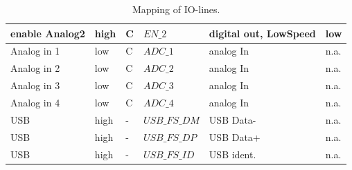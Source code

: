 \begin{table}[H]
\begin{tabular}{|l|l|l|l|l|l|}
					enable Analog2	& high 	& C		& $EN\_2$	& digital out, LowSpeed		& low		\\ \hline
					Analog in 1		& low 	& C		& $ADC\_1$	& analog In		& n.a.		\\ \hline
					Analog in 2		& low 	& C		& $ADC\_2$	& analog In		& n.a.		\\ \hline
					Analog in 3		& low 	& C		& $ADC\_3$	& analog In		& n.a.		\\ \hline
					Analog in 4		& low 	& C		& $ADC\_4$	& analog In		& n.a.		\\ \hline
					USB				& high 	& -		& $USB\_FS\_DM$	& USB Data-		& n.a.		\\ \hline
					USB				& high 	& -		& $USB\_FS\_DP$	& USB Data+		& n.a.		\\ \hline
					USB				& high 	& -		& $USB\_FS\_ID$	& USB ident.	& n.a.		\\ \hline
					\end{tabular}
					\caption{Mapping of IO-lines.}
					\label{tab:Mapping}
		\end{table}

